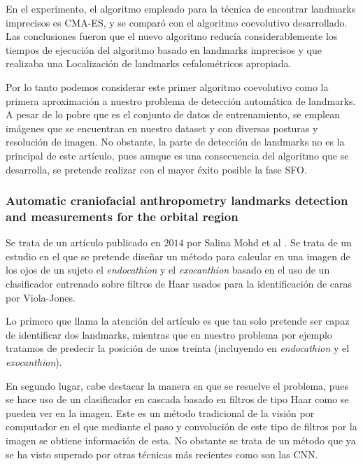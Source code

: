                 \noindent En el experimento, el algoritmo empleado para la técnica de encontrar landmarks imprecisos es CMA-ES, y se comparó con el algoritmo coevolutivo desarrollado. Las conclusiones fueron que el nuevo algoritmo reducía considerablemente los tiempos de ejecución del algoritmo basado en landmarks imprecisos y que realizaba una Localización de landmarks cefalométricos apropiada. 
                
                \medskip

                \noindent Por lo tanto podemos considerar este primer algoritmo coevolutivo como la primera aproximación a nuestro problema de detección automática de landmarks. A pesar de lo pobre que es el conjunto de datos de entrenamiento, se emplean imágenes que se encuentran en nuestro dataset y con diversas posturas y resolución de imagen. No obstante, la parte de detección de landmarks no es la principal de este artículo, pues aunque es una consecuencia del algoritmo que se desarrolla, se pretende realizar con el mayor éxito posible la fase SFO.

            \subsubsection{Automatic craniofacial anthropometry landmarks detection and measurements for the orbital region}
                \noindent Se trata de un artículo publicado en $2014$ por Salina Mohd et al \cite{asi2014automatic}. Se trata de un estudio en el que se pretende diseñar un método para calcular en una imagen de los ojos de un sujeto el \textit{endocathion} y el \textit{exocanthion} basado en el uso de un clasificador entrenado sobre filtros de Haar usados para la identificación de caras por Viola-Jones.

                \medskip

                \noindent Lo primero que llama la atención del artículo es que tan solo pretende ser capaz de identificar dos landmarks, mientras que en nuestro problema por ejemplo tratamos de predecir la posición de unos treinta (incluyendo en \textit{endocathion} y el \textit{exocanthion}).

                \medskip

                \noindent En segundo lugar, cabe destacar la manera en que se resuelve el problema, pues se hace uso de un clasificador en cascada basado en filtros de tipo Haar como se pueden ver en la imagen. Este es un método tradicional de la visión por computador en el que mediante el paso y convolución de este tipo de filtros por la imagen se obtiene información de esta. No obstante se trata de un método que ya se ha visto superado por otras técnicas más recientes como son las CNN.

